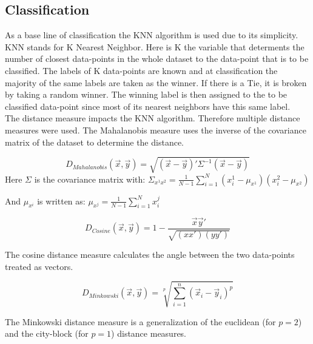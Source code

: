 


\subsection{Classification}

As a base line of classification the KNN algorithm is used due to its simplicity. KNN stands for K Nearest Neighbor. Here is K the variable that determents the number of closest data-points in the whole dataset to the data-point that is to be classified. The labels of K data-points are known and at classification the majority of the same labels are taken as the winner. If there is a Tie, it is broken by taking a random winner. The winning label is then assigned to the to be classified data-point since most of its nearest neighbors have this same label.
\\
\bigskip
The distance measure impacts the KNN algorithm. Therefore multiple distance measures were used. The Mahalanobis measure uses the inverse of the covariance matrix of the dataset to determine the distance.

\begin{equation}
D_{Mahalanobis}(\vec{x},\vec{y}) = \sqrt{(\vec{x}-\vec{y})'\Sigma^{-1}(\vec{x}-\vec{y})} 
\end{equation}
\bigskip
\noindent Here $\Sigma$ is the covariance matrix with: $\Sigma_{x^1x^2} = \frac{1}{N-1} \sum_{i=1}^{N}(x_i^1-\mu_{x^1})(x_i^2-\mu_{x^2})$ 

\noindent And $\mu_{x^i}$ is written as: $\mu_{x^j} = \frac{1}{N-1}\sum_{i=1}^N x_i^j$

\begin{equation}
D_{Cosine}(\vec{x},\vec{y})= 1 - \frac{\vec{x}\vec{y}'}{\sqrt{(xx')(yy')}}
\end{equation}

\noindent The cosine distance measure calculates the angle between the two data-points treated as vectors.

\begin{equation}
D_{Minkowski}(\vec{x},\vec{y}) = \sqrt[p]{\sum^n_{i=1}(\vec{x}_i-\vec{y}_i)^p}
\end{equation}

\noindent The Minkowski distance measure is a generalization of the euclidean (for $p=2$) and the city-block (for $p=1$) distance measures.

